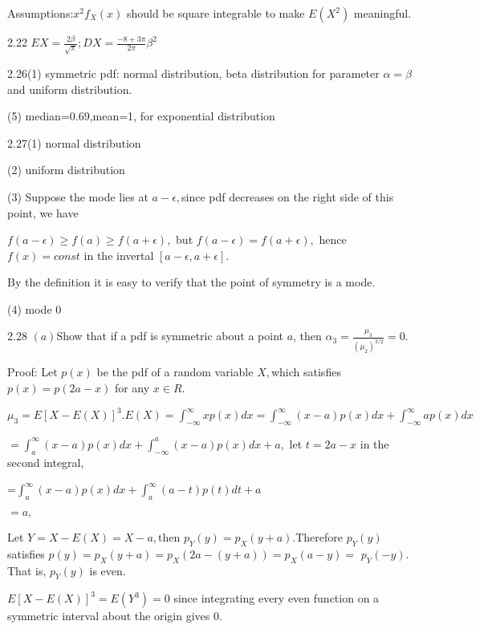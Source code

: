 \documentclass{article}
\begin{document}
Assumptions:$x^{2}f_{X}\left( x\right) $ should be square integrable to make 
$E\left( X^{2}\right) $ meaningful. 

2.22 $EX=\frac{2\beta }{\sqrt{\pi }};DX=\frac{-8+3\pi }{2\pi }\beta ^{2}$

2.26(1) symmetric pdf: normal distribution, beta distribution for parameter $%
\alpha =\beta $ and uniform distribution.

\qquad \qquad (5) median=0.69,mean=1, for exponential distribution

2.27(1) normal distribution\qquad \qquad

\qquad \qquad (2) uniform distribution

\qquad \qquad (3) Suppose the mode lies at $a-\epsilon ,$since pdf decreases
on the right side of this point, we have

$f(a-\epsilon )\geq f(a)\geq f(a+\epsilon ),$ but $f(a-\epsilon
)=f(a+\epsilon ),$ hence $f(x)=const$ in the invertal $\left[ a-\epsilon
,a+\epsilon \right] .$

By the definition it is easy to verify that the point of symmetry is a mode.

\qquad \qquad (4) mode 0

2.28 $\left( a\right) $Show that if a pdf is symmetric about a point $a$,
then $\alpha _{3}=\frac{\mu _{3}}{\left( \mu _{2}\right) ^{3/2}}=0.$

Proof: Let $p\left( x\right) $ be the pdf of a random variable $X,$which
satisfies $p\left( x\right) =p\left( 2a-x\right) $ for any $x\in R.$

$\mu _{3}=E\left[ X-E\left( X\right) \right] ^{3}.E\left( X\right)
=\int_{-\infty }^{\infty }xp\left( x\right) dx=\int_{-\infty }^{\infty
}\left( x-a\right) p\left( x\right) dx+\int_{-\infty }^{\infty }ap\left(
x\right) dx$

$=\int_{a}^{\infty }(x-a)p(x)dx+\int_{-\infty }^{a}(x-a)p(x)dx+a,$ let $%
t=2a-x$ in the second integral,

=$\int_{a}^{\infty }(x-a)p(x)dx+\int_{a}^{\infty }(a-t)p(t)dt+a$

$=a,$

Let $Y=X-E\left( X\right) =X-a,$then $p_{Y}\left( y\right) =p_{X}\left(
y+a\right) .$Therefore $p_{Y}\left( y\right) $ satisfies $p\left( y\right)
=p_{X}\left( y+a\right) =p_{X}\left( 2a-\left( y+a\right) \right)
=p_{X}\left( a-y\right) =$ $p_{Y}\left( -y\right) .$ That is, $p_{Y}\left(
y\right) $ is even.

$E\left[ X-E\left( X\right) \right] ^{3}=E\left( Y^{3}\right) =0$ since
integrating every even function on a symmetric interval about the origin
gives 0.
\end{document}
